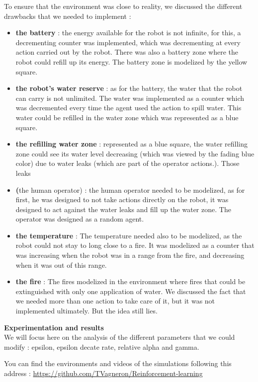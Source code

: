\documentclass[conference]{IEEEtran}
\begin{document}
To ensure that the environment was close to reality, we discussed the different drawbacks that we needed to implement :
\begin{itemize}
 \item \textbf{the battery} : the energy available for the robot is not infinite, for this, a decrementing counter was implemented, which was decrementing at every action carried out by the robot. There was also a battery zone where the robot could refill up its energy. The battery zone is modelized by the yellow square.
 \item \textbf{the robot's water reserve} : as for the battery, the water that the robot can carry is not unlimited. The water was implemented as a counter which was decremented every time the agent used the action to spill water. This water could be refilled in the water zone which was represented as a blue square.
 \item \textbf{the refilling water zone} : represented as a blue square, the water refilling zone could see its water level decreasing (which was viewed by the fading blue color) due to water leaks (which are part of the operator actions.). Those leaks
 \item \textbf(the human operator) : the human operator needed to be modelized, as for first, he was designed to not take actions directly on the robot, it was designed to act against the water leaks and fill up the water zone. The operator was designed as a random agent.
 \item \textbf{the temperature} : The temperature needed also to be modelized, as the robot could not stay to long close to a fire. It was modelized as a counter that was increasing when the robot was in a range from the fire, and decreasing when it was out of this range.
 \item \textbf{the fire} : The fires modelized in the environment where fires that could be extinguished with only one application of water. We discussed the fact that we needed more than one action to take care of it, but it was not implemented ultimately. But the idea still lies.
\end{itemize}

\textbf{Experimentation and results}\\

We will focus here on the analysis of the different parameters that we could modify : epsilon, epsilon decate rate, relative alpha and gamma.

You can find the environments and videos of the simulations following this address :
\url{https://github.com/TVagneron/Reinforcement-learning}\\
\end{document}

